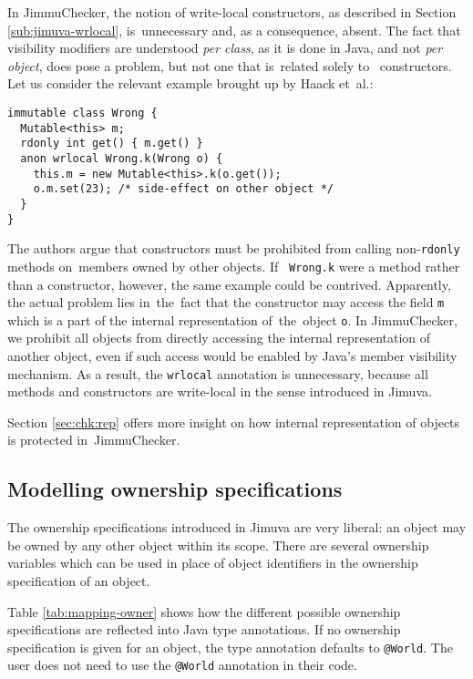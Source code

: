 \documentclass{pracamgr}
\theoremstyle{break}
\theoremstyle{break}
\theoremstyle{break}
\begin{document}
In JimmuChecker, the notion of write-local constructors, as described
in Section \ref{sub:jimuva-wrlocal}, is~unnecessary and, as a
consequence, absent. The fact that visibility modifiers are understood
\emph{per class}, as it is done in Java, and not \emph{per object},
does pose a problem, but not one that is~related solely to~
constructors. Let us consider the relevant example brought up by Haack
et~al.:
\begin{lstlisting}[morekeywords={immutable, anon, wrlocal, rdonly}]
immutable class Wrong {
  Mutable<this> m; 
  rdonly int get() { m.get() }
  anon wrlocal Wrong.k(Wrong o) {
    this.m = new Mutable<this>.k(o.get()); 
    o.m.set(23); /* side-effect on other object */
  }
}
\end{lstlisting}
The authors argue that constructors must be prohibited from calling
non-\texttt{rdonly} me\-thods on~members owned by other objects. If~
\texttt{Wrong.k} were a method rather than a constructor, however, the
same example could be contrived. Apparently, the actual problem lies
in~the~fact that the constructor may access the field \texttt{m} which
is a part of the internal representation of~the~object \texttt{o}. In
JimmuChecker, we prohibit all objects from directly accessing the
internal representation of another object, even if such access would
be enabled by Java's member visibility mechanism. As a result, the
\texttt{wrlocal} annotation is unnecessary, because all methods and
constructors are write-local in the sense introduced in Jimuva.

Section \ref{sec:chk:rep} offers more insight on how internal
representation of objects is protected in~JimmuChecker. 


\subsection{Modelling ownership specifications}
\label{sec:mod:ownership}

The ownership specifications introduced in Jimuva are very liberal: an
object may be owned by any other object within its scope.  There are
several ownership variables which can be used in place of object
identifiers in the ownership specification of an object.

Table \ref{tab:mapping-owner} shows how the different possible
ownership specifications are reflected into Java type annotations.
If no ownership specification is given for an object, the type
annotation defaults to \texttt{@World}. The user does not need to use
the \texttt{@World} annotation in their code.
\end{document}

